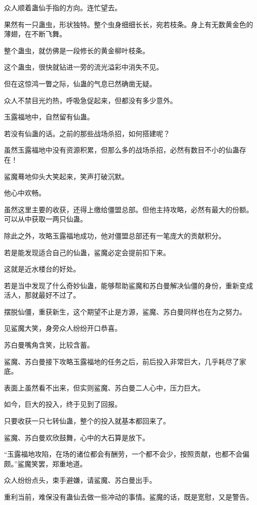 \begin{this_body}
众人顺着蛊仙手指的方向。连忙望去。

果然有一只蛊虫，形状独特。整个虫身细细长长，宛若枝条。身上有无数黄金色的薄翅，在不断飞舞。

整个蛊虫，就仿佛是一段修长的黄金柳叶枝条。

这个蛊虫，很快就钻进一旁的流光溢彩中消失不见。

但在这惊鸿一瞥之际，仙蛊的气息已然确凿无疑。

众人不禁目光灼热，呼吸急促起来，但都没有多少意外。

玉露福地中，自然留有仙蛊。

若没有仙蛊的话。之前的那些战场杀招，如何搭建呢？

虽然玉露福地中没有资源积累，但那么多的战场杀招，必然有数目不小的仙蛊存在！

鲨魔蓦地仰头大笑起来，笑声打破沉默。

他心中欢畅。

虽然这里主要的收获，还得上缴给僵盟总部。但他主持攻略，必然有最大的份额。可以从中获取一两只仙蛊。

除此之外，攻略玉露福地成功，他对僵盟总部还有一笔庞大的贡献积分。

若是能发现适合自己的仙蛊，鲨魔必定会提前扣下来。

这就是近水楼台的好处。

若是当中发现了什么奇妙仙蛊，能够帮助鲨魔和苏白曼解决仙僵的身份，重新变成活人，那就最好不过了。

摆脱仙僵，重获新生，这个期望不止是方源，鲨魔、苏白曼同样也在为之努力。

见鲨魔大笑，身旁众人纷纷开口恭喜。

苏白曼嘴角含笑，比较含蓄。

鲨魔、苏白曼接下攻略玉露福地的任务之后，前后投入非常巨大，几乎耗尽了家底。

表面上虽然看不出来，但实则鲨魔、苏白曼二人心中，压力巨大。

如今，巨大的投入，终于见到了回报。

只要收获一只七转仙蛊，整个的投入就基本都回来了。

鲨魔、苏白曼欢欣鼓舞，心中的大石算是放下。

“玉露福地攻陷，在场的诸位都会有酬劳，一个都不会少，按照贡献，也都不会偏颇。”鲨魔笑罢，郑重地道。

众人纷纷点头，束手避嫌，请鲨魔、苏白曼出手。

重利当前，难保没有蛊仙去做一些冲动的事情。鲨魔的话，既是宽慰，又是警告。


\end{this_body}
